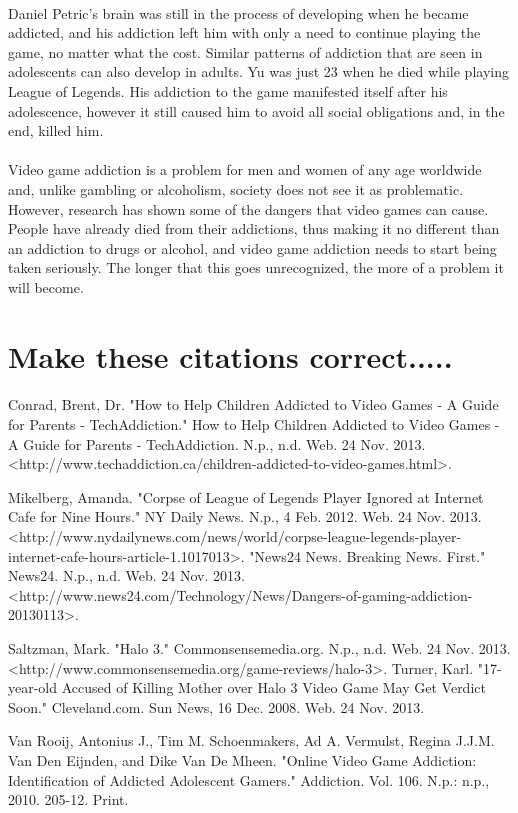 \documentclass[a4paper,man,natbib]{apa6}
\begin{document}
\paragraph{}
Daniel Petric’s brain was still in the process of developing when he became addicted, and his addiction left him with only a need to continue playing the game, no matter what the cost. Similar patterns of addiction that are seen in adolescents can also develop in adults. Yu was just 23 when he died while playing League of Legends. His addiction to the game manifested itself after his adolescence, however it still caused him to avoid all social obligations and, in the end, killed him.	
\paragraph{}
Video game addiction is a problem for men and women of any age worldwide and, unlike gambling or alcoholism, society does not see it as problematic. However, research has shown some of the dangers that video games can cause. People have already died from their addictions, thus making it no different than an addiction to drugs or alcohol, and video game addiction needs to start being taken seriously. The longer that this goes unrecognized, the more of a problem it will become.

\section{Make these citations correct.....}
\paragraph{}
Conrad, Brent, Dr. "How to Help Children Addicted to Video Games - A Guide for Parents - TechAddiction." How to Help Children Addicted to Video Games - A Guide for Parents - TechAddiction. N.p., n.d. Web. 24 Nov. 2013. <http://www.techaddiction.ca/children-addicted-to-video-games.html>.

Mikelberg, Amanda. "Corpse of League of Legends Player Ignored at Internet Cafe for Nine Hours." NY Daily News. N.p., 4 Feb. 2012. Web. 24 Nov. 2013. <http://www.nydailynews.com/news/world/corpse-league-legends-player-internet-cafe-hours-article-1.1017013>.
"News24 News. Breaking News. First." News24. N.p., n.d. Web. 24 Nov. 2013. <http://www.news24.com/Technology/News/Dangers-of-gaming-addiction-20130113>.

Saltzman, Mark. "Halo 3." Commonsensemedia.org. N.p., n.d. Web. 24 Nov. 2013. <http://www.commonsensemedia.org/game-reviews/halo-3>.
Turner, Karl. "17-year-old Accused of Killing Mother over Halo 3 Video Game May Get Verdict Soon." Cleveland.com. Sun News, 16 Dec. 2008. Web. 24 Nov. 2013. %

Van Rooij, Antonius J., Tim M. Schoenmakers, Ad A. Vermulst, Regina J.J.M. Van Den Eijnden, and Dike Van De Mheen. "Online Video Game Addiction: Identification of Addicted Adolescent Gamers." Addiction. Vol. 106. N.p.: n.p., 2010. 205-12. Print.
\end{document}
